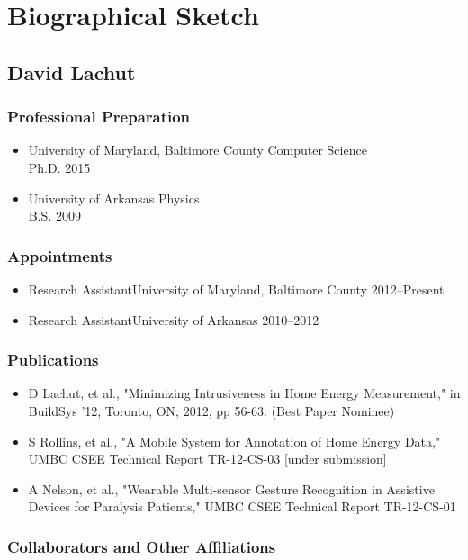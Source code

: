 \section{Biographical Sketch}
  \subsection{David Lachut}
    \subsubsection{Professional Preparation}
      \begin{itemize}
        \item University of Maryland, Baltimore County \hfill Computer Science
	  \\ Ph.D. 2015
	\item University of Arkansas \hfill Physics 
	  \\ B.S. 2009
      \end{itemize}
    \subsubsection{Appointments}
      \begin{itemize}
        \item Research Assistant\hfill University of Maryland, Baltimore County
        2012--Present
        \item Research Assistant\hfill University of Arkansas \hspace{105pt}
        2010--2012
      \end{itemize}
    \subsubsection{Publications}
      \begin{itemize}
	\item D Lachut, et al., "Minimizing Intrusiveness in Home Energy
	  Measurement," in BuildSys '12, Toronto, ON, 2012, pp 56-63. (Best
	  Paper Nominee)
        \item S Rollins, et al., "A Mobile System for Annotation of Home
	  Energy Data," UMBC CSEE Technical Report TR-12-CS-03 [under
	  submission]
        \item A Nelson, et al., "Wearable Multi-sensor Gesture Recognition in
	  Assistive Devices for Paralysis Patients," UMBC CSEE Technical Report
	  TR-12-CS-01
      \end{itemize}
    \subsubsection{Collaborators and Other Affiliations}
